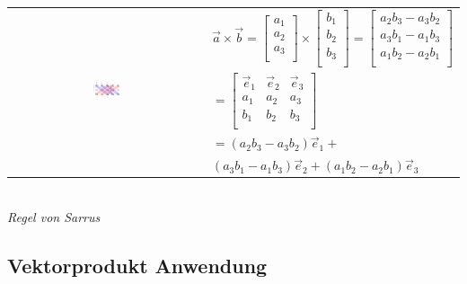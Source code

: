 \begin{tabular}{cl}
    \multirow{5}{*}{
        \includegraphics[width=0.15\textwidth]{assets/vectorproduct-build.png}
    }
    & $\vec{a} \times \vec{b} = \begin{bmatrix}
    		a_1 \\
    		a_2 \\
    		a_3 \\
    	\end{bmatrix} \times \begin{bmatrix}
    		b_1 \\
    		b_2 \\
    		b_3 \\
    	\end{bmatrix} = \begin{bmatrix}
    		a_2 b_3 - a_3 b_2 \\
    		a_3 b_1 - a_1 b_3 \\
    		a_1 b_2 - a_2 b_1 \\
    	\end{bmatrix}$ \\
    	& $= \begin{bmatrix}
            \vec{e}_1 & \vec{e}_2 & \vec{e}_3 \\
            a_1 & a_2 & a_3 \\
            b_1 & b_2 & b_3 \\
        \end{bmatrix}$ \\
    & $= (a_2 b_3 - a_3 b_2) \vec{e}_1 +$ \\
    & $(a_3 b_1 - a_1 b_3) \vec{e}_2 + (a_1 b_2 - a_2 b_1) \vec{e}_3 $ \\
\end{tabular} \\
\textit{Regel von Sarrus} \\

\subsection{Vektorprodukt Anwendung}


